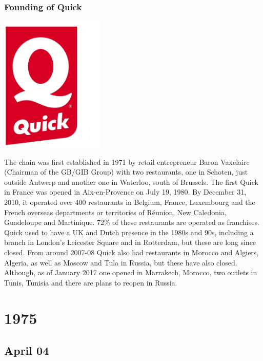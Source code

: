 \documentclass[11pt]{report}
\begin{document}
\subsection{Founding of Quick}
\vspace{2mm}\begin{center}\includegraphics[width=5cm]{./img/quickLogo.jpg}\end{center}
The chain was first established in 1971 by retail entrepreneur Baron Vaxelaire (Chairman of the GB/GIB Group) with two restaurants, one in Schoten, just outside Antwerp and another one in Waterloo, south of Brussels. The first Quick in France was opened in Aix-en-Provence on July 19, 1980. By December 31, 2010, it operated over 400 restaurants in Belgium, France, Luxembourg and the French overseas departments or territories of Réunion, New Caledonia, Guadeloupe and Martinique. 72\% of these restaurants are operated as franchises.\\ \indent Quick used to have a UK and Dutch presence in the 1980s and 90s, including a branch in London's Leicester Square and in Rotterdam, but these are long since closed. From around 2007-08 Quick also had restaurants in Morocco and Algiers, Algeria, as well as Moscow and Tula in Russia, but these have also closed. Although, as of January 2017 one opened in Marrakech, Morocco, two outlets in Tunis, Tunisia and there are plans to reopen in Russia.

\chapter{1975}
\section{April 04}
\end{document}
